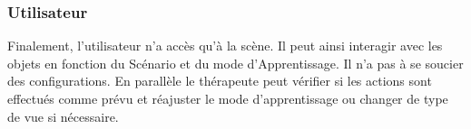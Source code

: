 \subsubsection{Utilisateur}
Finalement, l'utilisateur n'a accès qu'à la scène. Il peut ainsi interagir avec les objets en fonction du Scénario et du mode d'Apprentissage. Il n'a pas à se soucier des configurations. En parallèle le thérapeute peut vérifier si les actions sont effectués comme prévu et réajuster le mode d'apprentissage ou changer de type de vue si nécessaire.

